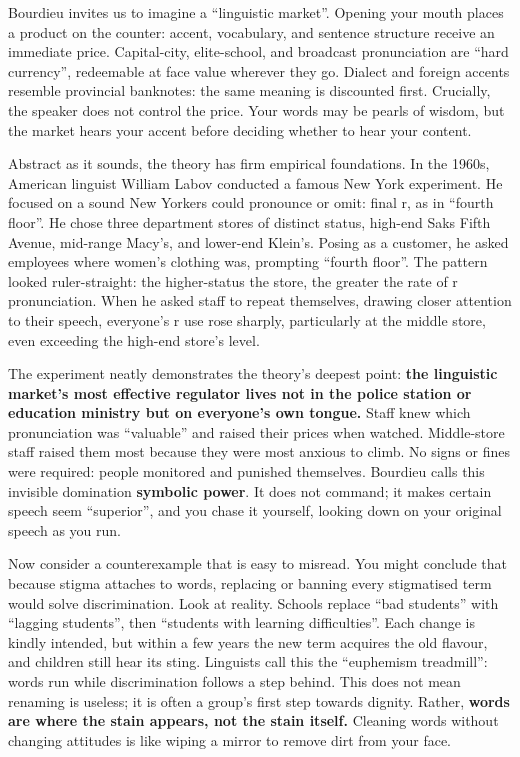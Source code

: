 Bourdieu invites us to imagine a ``linguistic market''. Opening your mouth places a product on the counter: accent, vocabulary, and sentence structure receive an immediate price. Capital-city, elite-school, and broadcast pronunciation are ``hard currency'', redeemable at face value wherever they go. Dialect and foreign accents resemble provincial banknotes: the same meaning is discounted first. Crucially, the speaker does not control the price. Your words may be pearls of wisdom, but the market hears your accent before deciding whether to hear your content.

Abstract as it sounds, the theory has firm empirical foundations. In the 1960s, American linguist William Labov conducted a famous New York experiment. He focused on a sound New Yorkers could pronounce or omit: final r, as in ``fourth floor''. He chose three department stores of distinct status, high-end Saks Fifth Avenue, mid-range Macy's, and lower-end Klein's. Posing as a customer, he asked employees where women's clothing was, prompting ``fourth floor''. The pattern looked ruler-straight: the higher-status the store, the greater the rate of r pronunciation. When he asked staff to repeat themselves, drawing closer attention to their speech, everyone's r use rose sharply, particularly at the middle store, even exceeding the high-end store's level.

The experiment neatly demonstrates the theory's deepest point: \textbf{the linguistic market's most effective regulator lives not in the police station or education ministry but on everyone's own tongue.} Staff knew which pronunciation was ``valuable'' and raised their prices when watched. Middle-store staff raised them most because they were most anxious to climb. No signs or fines were required: people monitored and punished themselves. Bourdieu calls this invisible domination \textbf{symbolic power}. It does not command; it makes certain speech seem ``superior'', and you chase it yourself, looking down on your original speech as you run.

Now consider a counterexample that is easy to misread. You might conclude that because stigma attaches to words, replacing or banning every stigmatised term would solve discrimination. Look at reality. Schools replace ``bad students'' with ``lagging students'', then ``students with learning difficulties''. Each change is kindly intended, but within a few years the new term acquires the old flavour, and children still hear its sting. Linguists call this the ``euphemism treadmill'': words run while discrimination follows a step behind. This does not mean renaming is useless; it is often a group's first step towards dignity. Rather, \textbf{words are where the stain appears, not the stain itself.} Cleaning words without changing attitudes is like wiping a mirror to remove dirt from your face.


